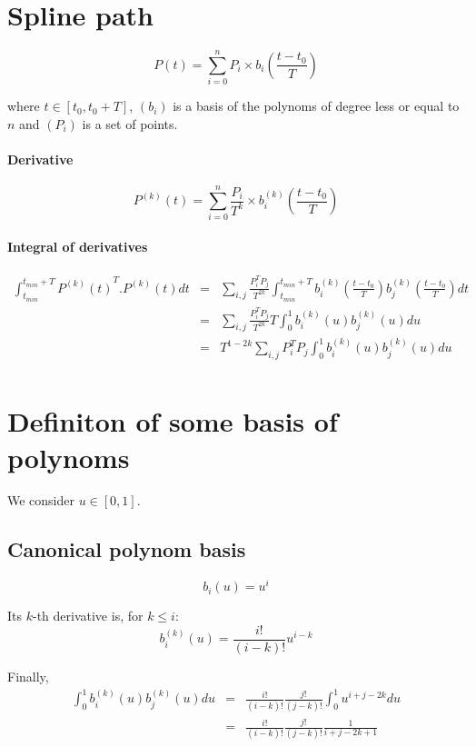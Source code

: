 \documentclass {article}
\begin{document}
\section{Spline path}

$$
P (t) = \sum_{i=0}^n P_i \times b_i(\frac{t - t_0}{T})
$$

where $t \in \left[ t_0, t_0 + T \right]$, $(b_i)$ is a basis of the polynoms
of degree less or equal to $n$ and $(P_i)$ is a set of points.

\paragraph{Derivative}

$$
P^{(k)} (t) = \sum_{i=0}^n \frac{P_i}{T^k} \times b_i^{(k)}(\frac{t - t_0}{T})
$$

\paragraph{Integral of derivatives}
\begin{eqnarray*}
\int_{t_{min}}^{t_{min} + T} {P^{(k)} (t)}^T . P^{(k)} (t) dt
&=& \sum_{i,j} \frac{P_i^T P_j}{T^{2k}} \int_{t_{min}}^{t_{min} + T} b_i^{(k)}(\frac{t - t_0}{T}) b_j^{(k)}(\frac{t - t_0}{T}) dt \\
&=& \sum_{i,j} \frac{P_i^T P_j}{T^{2k}} T \int_0^1 b_i^{(k)}(u) b_j^{(k)}(u) du \\
&=& T^{1-2k} \sum_{i,j} P_i^T P_j \int_0^1 b_i^{(k)}(u) b_j^{(k)}(u) du \\
\end{eqnarray*}


\section{Definiton of some basis of polynoms}

We consider $u \in \left[ 0,1 \right]$.

\subsection {Canonical polynom basis}

$$
b_i(u) = u^i
$$

Its $k$-th derivative is, for $k \le i$:
$$
b_i^{(k)} (u) = \frac{i!}{(i-k)!} u^{i-k}
$$

Finally,
\begin{eqnarray*}
\int_0^1 b_i^{(k)} (u) b_j^{(k)} (u) du
&=& \frac{i!}{(i-k)!} \frac{j!}{(j-k)!} \int_0^1 u^{i+j-2k} du \\
&=& \frac{i!}{(i-k)!} \frac{j!}{(j-k)!} \frac{1}{i+j-2k+1}
\end{eqnarray*}
\end{document}
